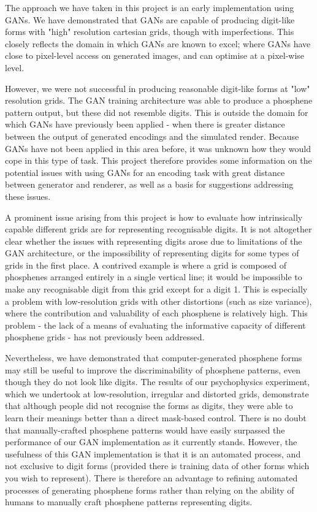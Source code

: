 \documentclass[a4paper,11pt,openany]{book}
\begin{document}
The approach we have taken in this project is an early implementation using GANs.
We have demonstrated that GANs are capable of producing digit-like forms with "high" resolution cartesian grids, though with imperfections.
This closely reflects the domain in which GANs are known to excel; where GANs have close to pixel-level access on generated images, and can optimise at a pixel-wise level.

However, we were not successful in producing reasonable digit-like forms at "low" resolution grids.
The GAN training architecture was able to produce a phosphene pattern output, but these did not resemble digits.
This is outside the domain for which GANs have previously been applied - when there is greater distance between the output of generated encodings and the simulated render.
Because GANs have not been applied in this area before, it was unknown how they would cope in this type of task.
This project therefore provides some information on the potential issues with using GANs for an encoding task with great distance between generator and renderer, as well as a basis for suggestions addressing these issues.

A prominent issue arising from this project is how to evaluate how intrinsically capable different grids are for representing recognisable digits.
It is not altogether clear whether the issues with representing digits arose due to limitations of the GAN architecture, or the impossibility of representing digits for some types of grids in the first place.
A contrived example is where a grid is composed of phosphenes arranged entirely in a single vertical line; it would be impossible to make any recognisable digit from this grid except for a digit 1.
This is especially a problem with low-resolution grids with other distortions (such as size variance), where the contribution and valuability of each phosphene is relatively high.
This problem - the lack of a means of evaluating the informative capacity of different phosphene grids - has not previously been addressed.

Nevertheless, we have demonstrated that computer-generated phosphene forms may still be useful to improve the discriminability of phosphene patterns, even though they do not look like digits.
The results of our psychophysics experiment, which we undertook at low-resolution, irregular and distorted grids, demonstrate that although people did not recognise the forms as digits, they were able to learn their meanings better than a direct mask-based control.
There is no doubt that manually-crafted phosphene patterns would have easily surpassed the performance of our GAN implementation as it currently stands.
However, the usefulness of this GAN implementation is that it is an automated process, and not exclusive to digit forms (provided there is training data of other forms which you wish to represent).
There is therefore an advantage to refining automated processes of generating phosphene forms rather than relying on the ability of humans to manually craft phosphene patterns representing digits.
\end{document}
